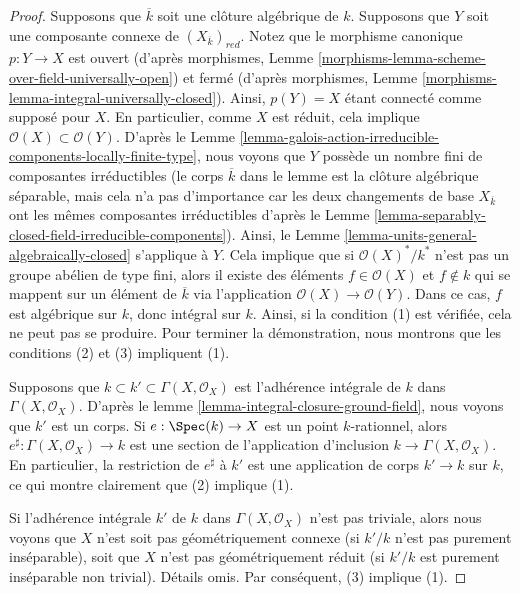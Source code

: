 \begin{proof}
Supposons que $\overline{k}$ soit une clôture algébrique de $k$.
Supposons que $Y$ soit une composante connexe de
$(X_{\overline{k}})_{red}$. Notez que le morphisme canonique $p : Y
\to X$ est ouvert (d'après morphismes, Lemme
\ref{morphisms-lemma-scheme-over-field-universally-open}) et fermé
(d'après morphismes, Lemme
\ref{morphisms-lemma-integral-universally-closed}). Ainsi, $p(Y) = X$ étant
connecté comme supposé pour $X$. En particulier, comme $X$ est réduit, cela
implique $\mathcal{O}(X) \subset \mathcal{O}(Y)$. D'après le Lemme
\ref{lemma-galois-action-irreducible-components-locally-finite-type}, nous
voyons que $Y$ possède un nombre fini de composantes irréductibles (le
corps $\overline{k}$ dans le lemme est la clôture algébrique séparable, mais
cela n'a pas d'importance car les deux changements de base
$X_{\overline{k}}$ ont les mêmes composantes irréductibles d'après le Lemme
\ref{lemma-separably-closed-field-irreducible-components}). Ainsi, le Lemme
\ref{lemma-units-general-algebraically-closed} s'applique à $Y$. Cela implique
que si $\mathcal{O}(X)^*/k^*$ n'est pas un groupe abélien de type fini, alors
il existe des éléments $f \in \mathcal{O}(X)$ et $f \not \in k$ qui se mappent
sur un élément de $\overline{k}$ via l'application $\mathcal{O}(X) \to
\mathcal{O}(Y)$. Dans ce cas, $f$ est algébrique sur $k$, donc intégral sur $k$.
Ainsi, si la condition (1) est vérifiée, cela ne peut pas se produire. Pour
terminer la démonstration, nous montrons que les conditions (2) et (3) impliquent (1).

\medskip\noindent
Supposons que $k \subset k' \subset \Gamma(X, \mathcal{O}_X)$
est l'adhérence intégrale de $k$ dans $\Gamma(X,
\mathcal{O}_X)$. D'après le lemme
\ref{lemma-integral-closure-ground-field}, nous voyons que $k'$ est
un corps. Si $e : \Spec(k) \to X$ est un point $k$-rationnel, alors
$e^\sharp : \Gamma(X, \mathcal{O}_X) \to k$ est une section de
l'application d'inclusion $k \to \Gamma(X, \mathcal{O}_X)$. En
particulier, la restriction de $e^\sharp$ à $k'$ est une application de
corps $k' \to k$ sur $k$, ce qui montre clairement que (2) implique (1).

\medskip\noindent
Si l'adhérence intégrale $k'$ de $k$ dans $\Gamma(X, \mathcal{O}_X)$
n'est pas triviale, alors nous voyons que $X$ n'est soit pas
géométriquement connexe (si $k'/k$ n'est pas purement inséparable),
soit que $X$ n'est pas géométriquement réduit (si $k'/k$ est purement
inséparable non trivial). Détails omis. Par conséquent, (3) implique (1).
\end{proof}

